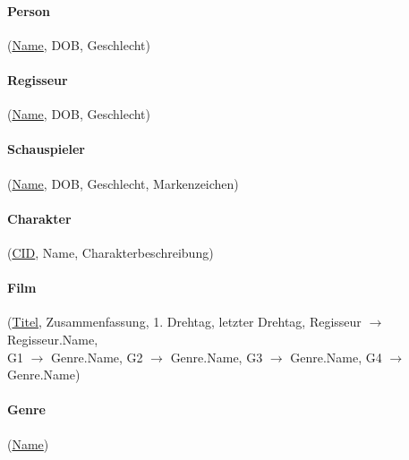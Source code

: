 \documentclass[a4paper,11pt,fleqn]{scrartcl}
\begin{document}
\begin{enumerate}
    		\paragraph{Person}(\underline{Name}, DOB, Geschlecht)
    		\paragraph{Regisseur}(\underline{Name}, DOB, Geschlecht)
		    \paragraph{Schauspieler}(\underline{Name}, DOB, Geschlecht, Markenzeichen)
		    \paragraph{Charakter}(\underline{CID}, Name, Charakterbeschreibung)
		    \paragraph{Film}(\underline{Titel}, Zusammenfassung, 1. Drehtag, letzter Drehtag, Regisseur $\rightarrow$ 	
		    Regisseur.Name,\\
		    \phantom{Film(00} G1 $\rightarrow$ Genre.Name, G2 $\rightarrow$ Genre.Name, G3 $\rightarrow$ Genre.Name, G4 
		    $\rightarrow$ Genre.Name)
		    \paragraph{Genre}(\underline{Name})

\end{enumerate}
\end{document}
